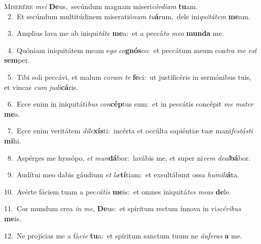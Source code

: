 \lettrine{\initial\textcolor{\initialcolor}{M}}{iserére} \textit{me}\-\textit{i} \textbf{De}\-us,~\star secúndum magnam miseri\-\textit{cór}\-\textit{di}\textit{am} \textbf{tu}\-am.\\
{\numbfont\textcolor{\numbcolor}{~2.}}~Et secúndum multitúdinem miseratió\textit{num} \textit{tu}\-\textbf{á}rum,~\star dele ini\-\textit{qui}\-\textit{tá}\textit{tem} \textbf{me}\-am.\par
{\numbfont\textcolor{\numbcolor}{~3.}}~Amplius lava me ab iniqui\-\textit{tá}\-\textit{te} \textbf{me}\-a:~\star et a peccá\textit{to} \textit{me}\-\textit{o} \textbf{mun}\-\textbf{da} me.\par
{\numbfont\textcolor{\numbcolor}{~4.}}~Quóniam iniquitátem meam e\textit{go} \textit{co}\-\textbf{gnós}co:~\star et peccátum meum con\textit{tra} \textit{me} \textit{est} \textbf{sem}\-per.\par
{\numbfont\textcolor{\numbcolor}{~5.}}~Tibi soli peccávi, et malum co\textit{ram} \textit{te} \textbf{fe}\-ci:~\star ut justificéris in sermónibus tuis, et vincas \textit{cum} \textit{ju}\-\textit{di}\textbf{cá}ris.\par
{\numbfont\textcolor{\numbcolor}{~6.}}~Ecce enim in iniquitáti\textit{bus} \textit{con}\-\textbf{cép}tus sum:~\star et in peccátis concépit \textit{me} \textit{ma}\-\textit{ter} \textbf{me}\-a.\par
{\numbfont\textcolor{\numbcolor}{~7.}}~Ecce enim veritátem \textit{di}\-\textit{le}\textbf{xís}ti:~\star incérta et occúlta sapiéntiæ tuæ mani\-\textit{fes}\-\textit{tás}\textit{ti} \textbf{mi}\-hi.\par
{\numbfont\textcolor{\numbcolor}{~8.}}~Aspérges me hyssópo, \textit{et} \textit{mun}\-\textbf{dá}bor:~\star lavábis me, et super ni\textit{vem} \textit{de}\-\textit{al}\textbf{bá}bor.\par
{\numbfont\textcolor{\numbcolor}{~9.}}~Audítui meo dabis gáudium \textit{et} \textit{læ}\-\textbf{tí}tiam:~\star et exsultábunt ossa \textit{hu}\-\textit{mi}\textit{li}\textbf{á}ta.\par
{\numbfont\textcolor{\numbcolor}{10.}}~Avérte fáciem tuam a pec\-\textit{cá}\-\textit{tis} \textbf{me}\-is:~\star et omnes iniquitá\textit{tes} \textit{me}\-\textit{as} \textbf{de}\-le.\par
{\numbfont\textcolor{\numbcolor}{11.}}~Cor mundum crea \textit{in} \textit{me}\-, \textbf{De}\-us:~\star et spíritum rectum ínnova in vi\-\textit{scé}\-\textit{ri}\textit{bus} \textbf{me}\-is.\par
{\numbfont\textcolor{\numbcolor}{12.}}~Ne projícias me a fá\-\textit{ci}\-\textit{e} \textbf{tu}\-a:~\star et spíritum sanctum tuum ne \textit{áu}\-\textit{fe}\textit{ras} \textbf{a} me.\par
